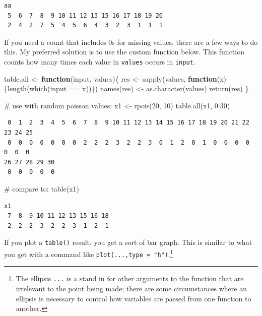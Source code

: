 \documentclass[
  13,
  letterpaper,
]{report}
\newenvironment{Shaded}{\begin{snugshade}}{\end{snugshade}}
\newcommand{\CommentTok}[1]{\textcolor[rgb]{0.37,0.37,0.37}{#1}}
\newcommand{\ControlFlowTok}[1]{\textcolor[rgb]{0.00,0.23,0.31}{\textbf{#1}}}
\newcommand{\DecValTok}[1]{\textcolor[rgb]{0.68,0.00,0.00}{#1}}
\newcommand{\FunctionTok}[1]{\textcolor[rgb]{0.28,0.35,0.67}{#1}}
\newcommand{\NormalTok}[1]{\textcolor[rgb]{0.00,0.23,0.31}{#1}}
\newcommand{\OtherTok}[1]{\textcolor[rgb]{0.00,0.23,0.31}{#1}}
\newcommand{\SpecialCharTok}[1]{\textcolor[rgb]{0.37,0.37,0.37}{#1}}
\begin{document}
\begin{verbatim}
aa
 5  6  7  8  9 10 11 12 13 15 16 17 18 19 20 
 2  4  2  7  5  4  5  6  4  3  2  3  1  1  1 
\end{verbatim}

If you need a count that includes 0s for missing values, there are a few
ways to do this. My preferred solution is to use the custom function
below. This function counts how many times each value in \texttt{values}
occurs in \texttt{input}.

\begin{Shaded}
\begin{Highlighting}[]
\NormalTok{table.all }\OtherTok{\textless{}{-}} \ControlFlowTok{function}\NormalTok{(input, values)\{}
\NormalTok{    res }\OtherTok{\textless{}{-}} \FunctionTok{sapply}\NormalTok{(values, }
                   \ControlFlowTok{function}\NormalTok{(x)\{}\FunctionTok{length}\NormalTok{(}\FunctionTok{which}\NormalTok{(input }\SpecialCharTok{==}\NormalTok{ x))\})}
    \FunctionTok{names}\NormalTok{(res) }\OtherTok{\textless{}{-}} \FunctionTok{as.character}\NormalTok{(values)}
    \FunctionTok{return}\NormalTok{(res)}
\NormalTok{\}}

\CommentTok{\# use with random poisson values:}
\NormalTok{x1 }\OtherTok{\textless{}{-}} \FunctionTok{rpois}\NormalTok{(}\DecValTok{20}\NormalTok{, }\DecValTok{10}\NormalTok{)}
\FunctionTok{table.all}\NormalTok{(x1, }\DecValTok{0}\SpecialCharTok{:}\DecValTok{30}\NormalTok{)}
\end{Highlighting}
\end{Shaded}

\begin{verbatim}
 0  1  2  3  4  5  6  7  8  9 10 11 12 13 14 15 16 17 18 19 20 21 22 23 24 25 
 0  0  0  0  0  0  0  2  2  2  3  2  2  3  0  1  2  0  1  0  0  0  0  0  0  0 
26 27 28 29 30 
 0  0  0  0  0 
\end{verbatim}

\begin{Shaded}
\begin{Highlighting}[]
\CommentTok{\# compare to:}
\FunctionTok{table}\NormalTok{(x1)}
\end{Highlighting}
\end{Shaded}

\begin{verbatim}
x1
 7  8  9 10 11 12 13 15 16 18 
 2  2  2  3  2  2  3  1  2  1 
\end{verbatim}

If you plot a \texttt{table()} result, you get a sort of bar graph. This
is similar to what you get with a command like
\texttt{plot(...,type\ =\ "h")}.\footnote{The ellipsis \texttt{...} is a
  stand in for other arguments to the function that are irrelevant to
  the point being made; there are some circumstances where an ellipsis
  is necessary to control how variables are passed from one function to
  another.}
\end{document}
